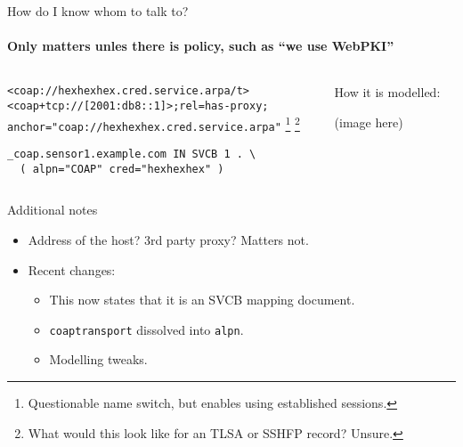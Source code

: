 \begin{frame}[fragile]{How do I know whom to talk to?}
    \framesubtitle{Only matters unles there is policy, such as ``we use WebPKI''}
    \begin{columns}
        \begin{column}{0.7\textwidth}
            \vspace{1cm}

\texttt{<coap://hexhexhex.cred.service.arpa/t>}\\
\texttt{<coap+tcp://[2001:db8::1]>;rel=has-proxy;}\\
\texttt{\qquad{}anchor="coap://hexhexhex.cred.service.arpa"}
            \footnote{Questionable name switch, but enables using established sessions.}
            \footnote{What would this look like for an TLSA or SSHFP record? Unsure.}
           
            \vspace{1cm}

\begin{verbatim}
_coap.sensor1.example.com IN SVCB 1 . \
  ( alpn="COAP" cred="hexhexhex" )
\end{verbatim}
            \vspace{1cm}
        \end{column}
        \begin{column}{0.3\textwidth}
            How it is modelled:
            
            (image here)
        \end{column}
    \end{columns}
\end{frame}

\begin{frame}{Additional notes}\large

    \begin{itemize}
        \item Address of the host? 3rd party proxy? Matters not.
            \bigskip
        \item  Recent changes:
        \begin{itemize}\Large
            \item This now states that it is an SVCB mapping document.
            \item \texttt{coaptransport} dissolved into \texttt{alpn}.
            \item Modelling tweaks.
        \end{itemize}
    \end{itemize}
\end{frame}

